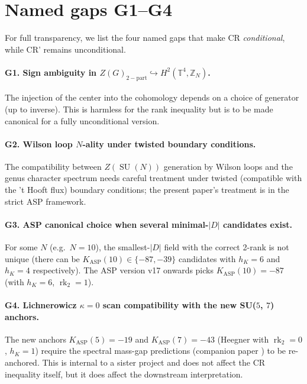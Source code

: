 \documentclass[11pt,a4paper,reqno]{amsart}
\theoremstyle{definition}
\DeclareMathOperator{\SU}{SU}
\DeclareMathOperator{\rk}{rk}
\newcommand{\KASP}{K_{\mathrm{ASP}}}
\newcommand{\ZZ}{\mathbb{Z}}
\newcommand{\TT}{\mathbb{T}}
\begin{document}
\section{Named gaps G1--G4}\label{sec:gaps}

For full transparency, we list the four named gaps that make CR \emph{conditional}, while CR' remains unconditional.

\paragraph{G1. Sign ambiguity in $Z(G)_{2-\mathrm{part}} \hookrightarrow H^2(\TT^4, \ZZ_N)$.} The injection of the center into the cohomology depends on a choice of generator (up to inverse). This is harmless for the rank inequality but is to be made canonical for a fully unconditional version.

\paragraph{G2. Wilson loop $N$-ality under twisted boundary conditions.} The compatibility between $Z(\SU(N))$ generation by Wilson loops and the genus character spectrum needs careful treatment under twisted (compatible with the 't Hooft flux) boundary conditions; the present paper's treatment is in the strict ASP framework.

\paragraph{G3. ASP canonical choice when several minimal-$|D|$ candidates exist.} For some $N$ (e.g.~$N=10$), the smallest-$|D|$ field with the correct 2-rank is not unique (there can be $\KASP(10)\in\{-87,-39\}$ candidates with $h_K=6$ and $h_K=4$ respectively). The ASP version v17 onwards picks $\KASP(10) = -87$ (with $h_K=6$, $\rk_2=1$).

\paragraph{G4. Lichnerowicz $\kappa=0$ scan compatibility with the new SU($5$, $7$) anchors.} The new anchors $\KASP(5)=-19$ and $\KASP(7)=-43$ (Heegner with $\rk_2=0$, $h_K=1$) require the spectral mass-gap predictions (companion paper \cite{Remondiere2026Selberg}) to be re-anchored. This is internal to a sister project and does not affect the CR inequality itself, but it does affect the downstream interpretation.
\end{document}
